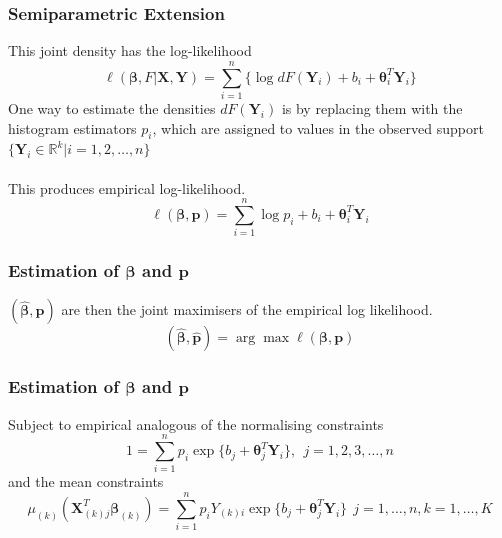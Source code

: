 \documentclass[9pt,notes=hide]{beamer}
\newcommand{\vect}[1]{\boldsymbol #1}
\newcommand{\R}{\mathbb R}
\newcommand{\vbe}{\vect{\beta}}
\newcommand{\X}{\vect{X}}
\newcommand{\Y}{\vect{Y}}
\begin{document}
\begin{frame}
	\frametitle{Semiparametric Extension}
	This joint density has the log-likelihood
	\begin{equation*}\label{eq:SemiParametricLikelihood}
		\ell(\vbe, F|\X, \Y) = \sum_{i = 1}^{n} \Bigg\{ \log dF(\Y_i) + b_i + \vect{\theta}_i^T\Y_i\Bigg\}
	\end{equation*}
	\pause
	One way to estimate the densities $dF(\Y_i)$ is by replacing them  with the
	histogram estimators $p_i$, which  are assigned to values in the observed
	support $\{\Y_i \in \R^k| i = 1, 2, \dots, n \}$\\
	\pause
	\vspace{0.1cm}\\
	This produces empirical log-likelihood.
	\begin{equation*}\label{eq:chap2:empiricalLogLikelihood}
		\ell(\vbe, \vect{p}) = \sum_{i = 1}^{n} \log p_i + b_i + \vect{\theta}_i^T\Y_i
	\end{equation*}

\end{frame}


\begin{frame}
	\frametitle{Estimation of $\vbe$ and $\vect{p}$}
	$(\hat{\vbe}, \hat{\vect{p}}) $ are then the joint maximisers of the empirical log likelihood.
	\begin{equation*}
		(\hat{\vbe}, \hat{\vect{p}}) = \arg\max  \ell(\vbe, \vect{p})
	\end{equation*}
\end{frame}


\begin{frame}
	\frametitle{Estimation of $\vbe$ and $\vect{p}$}
	Subject to  empirical analogous of the normalising constraints
	\begin{equation*}\label{eq:chap2:empiricalNormalisationConstraint}
		1 = \sum_{i = 1}^{n} p_i \exp \{b_j + \vect{\theta}_j^T\Y_i \}, \  \ j = 1, 2, 3,  \dots, n
	\end{equation*}
	\pause
	and the mean constraints
	\begin{equation*}\label{eq:chap2:empiricalMeanConstraint}
		\mu_{(k)}(\X_{(k)j}^T\vbe_{(k)}) = \sum_{i = 1}^{n} p_iY_{(k)i} \exp \{b_j + \vect{\theta}_j^T\Y_i \}\  \ j = 1,  \dots, n, k = 1,\dots, K
	\end{equation*}
\end{frame}


\end{document}
